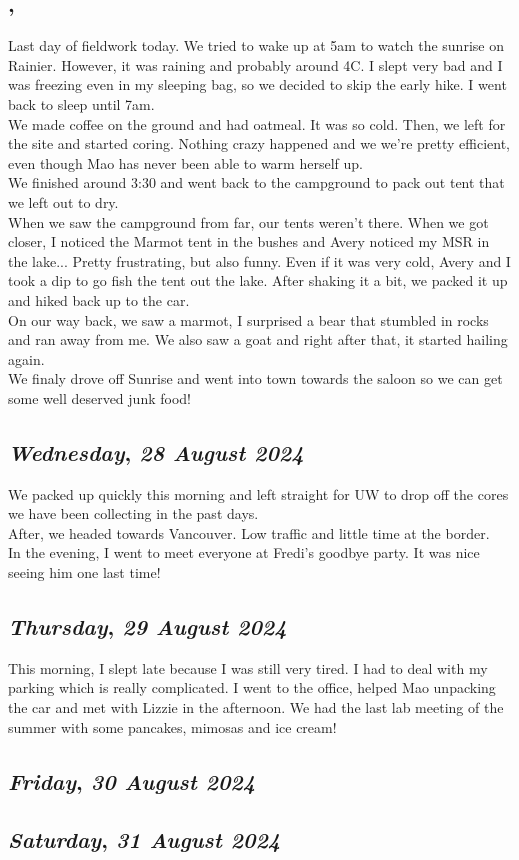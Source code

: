 \subsection*{\weekday, \day}
Last day of fieldwork today. We tried to wake up at 5am to watch the sunrise on Rainier. However, it was raining and probably around 4C. I slept very bad and I was freezing even in my sleeping bag, so we decided to skip the early hike. I went back to sleep until 7am.\\
We made coffee on the ground and had oatmeal. It was so cold. Then, we left for the site and started coring. Nothing crazy happened and we we're pretty efficient, even though Mao has never been able to warm herself up. \\ 
We finished around 3:30 and went back to the campground to pack out tent that we left out to dry. \\
When we saw the campground from far, our tents weren't there. When we got closer, I noticed the Marmot tent in the bushes and Avery noticed my MSR in the lake... Pretty frustrating, but also funny. Even if it was very cold, Avery and I took a dip to go fish the tent out the lake. After shaking it a bit, we packed it up and hiked back up to the car. \\
On our way back, we saw a marmot, I surprised a bear that stumbled in rocks and ran away from me. We also saw a goat and right after that, it started hailing again. \\
We finaly drove off Sunrise and went into town towards the saloon so we can get some well deserved junk food!

\def\day{\textit{28 August 2024}}
\def\weekday{\textit{Wednesday}}
\subsection*{\weekday, \day}
We packed up quickly this morning and left straight for UW to drop off the cores we have been collecting in the past days.\\ After, we headed towards Vancouver. Low traffic and little time at the border.\\

In the evening, I went to meet everyone at Fredi's goodbye party. It was nice seeing him one last time!

\def\day{\textit{29 August 2024}}
\def\weekday{\textit{Thursday}}
\subsection*{\weekday, \day}
This morning, I slept late because I was still very tired. I had to deal with my parking which is really complicated. I went to the office, helped Mao unpacking the car and met with Lizzie in the afternoon. We had the last lab meeting of the summer with some pancakes, mimosas and ice cream!

\def\day{\textit{30 August 2024}}
\def\weekday{\textit{Friday}}
\subsection*{\weekday, \day}

\def\day{\textit{31 August 2024}}
\def\weekday{\textit{Saturday}}
\subsection*{\weekday, \day}
